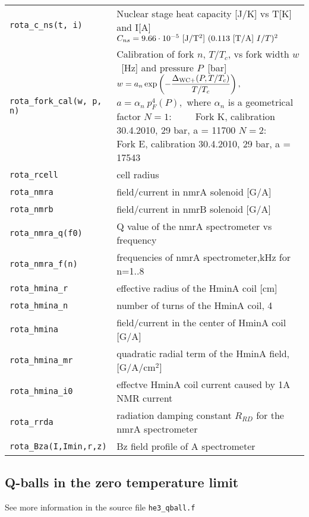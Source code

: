 \documentclass[a4paper]{article}
\begin{document}
\medskip
\noindent\begin{tabular}{lp{11cm}}
\tt rota\_c\_ns(t, i) &Nuclear stage heat capacity [J/K] vs T[K] and I[A]\newline
   $C_{ns} = 9.66 \cdot 10^{-5}\ {\rm [J/T^2]} \ (0.113\ {\rm [T/A]}\  I/T)^2$\\

\tt rota\_fork\_cal(w, p, n) &Calibration of fork $n$, $T/T_c$, vs fork width $w$~[Hz] and pressure $P$~[bar]\newline
   $\displaystyle w = a_n
     \exp\left(-\frac{\Delta_{\rm WC+}(P, T/T_c)}{T/T_c}\right),$\newline
   $a = \alpha_n \ p_F^4(P),$ where $\alpha_n$ is a geometrical factor\newline
   $N=1:\qquad $ Fork K, calibration 30.4.2010, 29 bar, a = 11700\newline
   $N=2:\qquad $ Fork E, calibration 30.4.2010, 29 bar, a = 17543\\

\tt rota\_rcell     & cell radius\\
\tt rota\_nmra      & field/current in nmrA solenoid [G/A]\\
\tt rota\_nmrb      & field/current in nmrB solenoid [G/A]\\
\tt rota\_nmra\_q(f0) & Q value of the nmrA spectrometer vs frequency\\
\tt rota\_nmra\_f(n)  & frequencies of nmrA spectrometer,kHz for n=1..8\\
\tt rota\_hmina\_r  & effective radius of the HminA coil [cm]\\
\tt rota\_hmina\_n  & number of turns of the HminA coil, 4\\
\tt rota\_hmina     & field/current in the center of HminA coil [G/A]\\
\tt rota\_hmina\_mr & quadratic radial term of the HminA field, [G/A/cm$^2$]\\
\tt rota\_hmina\_i0 & effectve HminA coil current caused by 1A NMR current\\
\tt rota\_rrda      & radiation damping constant $R_{RD}$ for the nmrA spectrometer\\
\tt rota\_Bza(I,Imin,r,z) & Bz field profile of A spectrometer\\
\end{tabular}

\eject
\subsection*{Q-balls in the zero temperature limit}
See more information in the source file {\tt he3\_qball.f}
\end{document}
